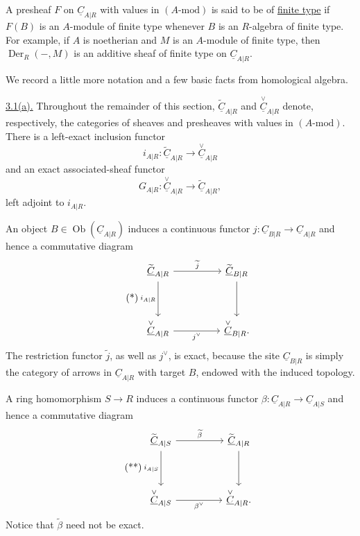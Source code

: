 A presheaf $F$ on $\underline C_{A|R}$ with values in
$(A\text{-mod})$ is said to be of \underline{finite type} if $F(B)$
is an $A$-module of finite type whenever $B$ is an $R$-algebra of
finite type. For example, if $A$ is noetherian and $M$ is an
$A$-module of finite type, then $\operatorname{Der}_R(-,M)$ is an
additive sheaf of finite type on $\underline C_{A|R}$.

We record a little more notation and a few basic facts from
homological algebra.

\underline{3.1(a).} Throughout the remainder of this section,
$\widetilde{\underline C}_{A|R}$ and
$\overset{\vee}{\underline C}_{A|R}$ denote, respectively, the
categories of sheaves and presheaves with values in
$(A\text{-mod})$. There is a left-exact inclusion functor
\[
 i_{A|R}:\widetilde{\underline C}_{A|R}
 \longrightarrow\overset{\vee}{\underline C}_{A|R}
\]
and an exact associated-sheaf functor
\[
 G_{A|R}:\overset{\vee}{\underline C}_{A|R}
 \longrightarrow\widetilde{\underline C}_{A|R},
\]
left adjoint to $i_{A|R}$.


An object $B\in\operatorname{Ob}(\underline C_{A|R})$ induces a
continuous functor
$j:\underline C_{B|R}\longrightarrow\underline C_{A|R}$ and hence
a commutative diagram
\begin{equation}\tag{*}
\begin{tikzcd}[column sep=huge,row sep=huge]
 \widetilde{\underline C}_{A|R}
   \arrow[r,"\widetilde j"] \arrow[d,"i_{A|R}"']
 & \widetilde{\underline C}_{B|R} \arrow[d] \\
 \overset{\vee}{\underline C}_{A|R}
   \arrow[r,"j^{\vee}"']
 & \overset{\vee}{\underline C}_{B|R}.
\end{tikzcd}
\end{equation}
The restriction functor $\widetilde j$, as well as $j^{\vee}$, is
exact, because the site $\underline C_{B|R}$ is simply the category
of arrows in $\underline C_{A|R}$ with target $B$, endowed with the
induced topology.

A ring homomorphism $S\longrightarrow R$ induces a continuous
functor
$\beta:\underline C_{A|R}\longrightarrow\underline C_{A|S}$ and
hence a commutative diagram
\begin{equation}\tag{**}
\begin{tikzcd}[column sep=huge,row sep=huge]
 \widetilde{\underline C}_{A|S}
   \arrow[r,"\widetilde\beta"] \arrow[d,"i_{A|S}"']
 & \widetilde{\underline C}_{A|R} \arrow[d] \\
 \overset{\vee}{\underline C}_{A|S}
   \arrow[r,"\beta^{\vee}"']
 & \overset{\vee}{\underline C}_{A|R}.
\end{tikzcd}
\end{equation}
Notice that $\widetilde\beta$ need not be exact.

